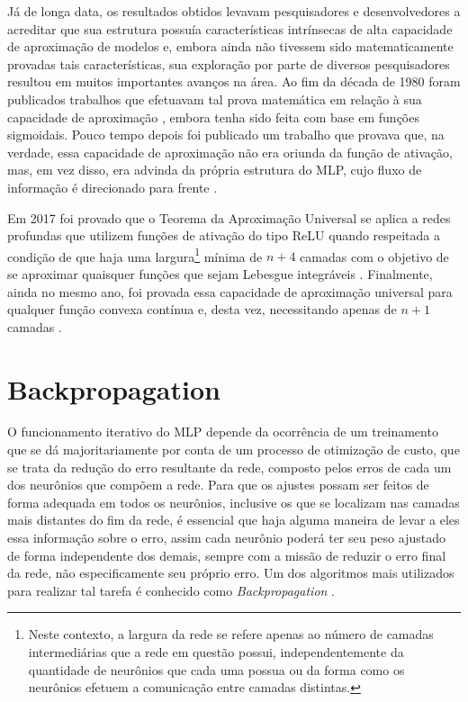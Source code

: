 Já de longa data, os resultados obtidos levavam pesquisadores e desenvolvedores a acreditar que sua estrutura possuía características intrínsecas de alta capacidade de aproximação de modelos e, embora ainda não tivessem sido matematicamente provadas tais características, sua exploração por parte de diversos pesquisadores resultou em muitos importantes avanços na área. Ao fim da década de 1980 foram publicados trabalhos que efetuavam tal prova matemática em relação à sua capacidade de aproximação \citep{cybenko1989approximation, hornik1989multilayer}, embora tenha sido feita com base em funções sigmoidais. Pouco tempo depois foi publicado um trabalho que provava que, na verdade, essa capacidade de aproximação não era oriunda da função de ativação, mas, em vez disso, era advinda da própria estrutura do MLP, cujo fluxo de informação é direcionado para frente \citep{HORNIK1991251}.

Em 2017 foi provado que o Teorema da Aproximação Universal se aplica a redes profundas que utilizem funções de ativação do tipo ReLU quando respeitada a condição de que haja uma largura\footnote{Neste contexto, a largura da rede se refere apenas ao número de camadas intermediárias que a rede em questão possui, independentemente da quantidade de neurônios que cada uma possua ou da forma como os neurônios efetuem a comunicação entre camadas distintas.} mínima de $n+4$ camadas com o objetivo de se aproximar quaisquer funções que sejam Lebesgue integráveis \citep{royden1988real}. Finalmente, ainda no mesmo ano, foi provada essa capacidade de aproximação universal para qualquer função convexa contínua e, desta vez, necessitando apenas de $n+1$ camadas \citep{hanin2017universal}.




\section{Backpropagation}
\label{sec:ann_backpropagation}

O funcionamento iterativo do MLP depende da ocorrência de um treinamento que se dá majoritariamente por conta de um processo de otimização de custo, que se trata da redução do erro resultante da rede, composto pelos erros de cada um dos neurônios que compõem a rede. Para que os ajustes possam ser feitos de forma adequada em todos os neurônios, inclusive os que se localizam nas camadas mais distantes do fim da rede, é essencial que haja alguma maneira de levar a eles essa informação sobre o erro, assim cada neurônio poderá ter seu peso ajustado de forma independente dos demais, sempre com a missão de reduzir o erro final da rede, não especificamente seu próprio erro. Um dos algoritmos mais utilizados para realizar tal tarefa é conhecido como \textit{Backpropagation} \citep{rumelhart1988learning}.

